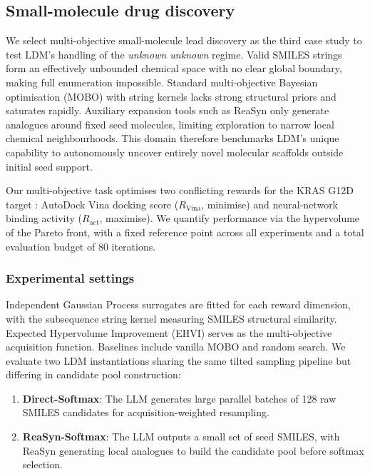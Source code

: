 \subsection{Small-molecule drug discovery}
\label{sec:cs-molecule-results}

We select multi-objective small-molecule lead discovery as the third case study to test LDM’s handling of the \emph{unknown unknown} regime. Valid SMILES strings form an effectively unbounded chemical space with no clear global boundary, making full enumeration impossible. Standard multi-objective Bayesian optimisation (MOBO) with string kernels lacks strong structural priors and saturates rapidly. Auxiliary expansion tools such as ReaSyn only generate analogues around fixed seed molecules, limiting exploration to narrow local chemical neighbourhoods. This domain therefore benchmarks LDM’s unique capability to autonomously uncover entirely novel molecular scaffolds outside initial seed support.

Our multi-objective task optimises two conflicting rewards for the KRAS G12D target \citep{kumarOverviewKRASG12D2026}: AutoDock Vina \citep{trott2010AutoDockVina} docking score (\(R_{\mathrm{Vina}}\), minimise) and neural-network binding activity (\(R_{\mathrm{act}}\), maximise). We quantify performance via the hypervolume of the Pareto front, with a fixed reference point across all experiments and a total evaluation budget of 80 iterations.

\subsubsection{Experimental settings}

Independent Gaussian Process surrogates are fitted for each reward dimension, with the subsequence string kernel measuring SMILES structural similarity. Expected Hypervolume Improvement (EHVI) serves as the multi-objective acquisition function. Baselines include vanilla MOBO and random search. We evaluate two LDM instantiations sharing the same tilted sampling pipeline but differing in candidate pool construction:
\begin{enumerate}
    \item \textbf{Direct-Softmax}: The LLM generates large parallel batches of 128 raw SMILES candidates for acquisition-weighted resampling.
    \item \textbf{ReaSyn-Softmax}: The LLM outputs a small set of seed SMILES, with ReaSyn generating local analogues to build the candidate pool before softmax selection.
\end{enumerate}

